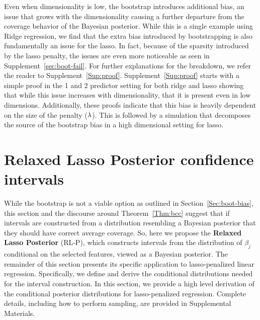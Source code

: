 Even when dimensionality is low, the bootstrap introduces additional bias, an issue that grows with the dimensionality causing a further departure from the coverage behavior of the Bayesian posterior. While this is a single example using Ridge regression, we find that the extra bias introduced by bootstrapping is also fundamentally an issue for the lasso. In fact, because of the sparsity introduced by the lasso penalty, the issues are even more noticeable as seen in Supplement~\ref{sec:boot-fail}. For further explanations for the breakdown, we refer the reader to Supplement~\ref{Sup:proof}. Supplement~\ref{Sup:proof} starts with a simple proof in the 1 and 2 predictor setting for both ridge and lasso showing that while this issue increases with dimensionality, that it is present even in low dimensions. Additionally, these proofs indicate that this bias is heavily dependent on the size of the penalty ($\lambda$). This is followed by a simulation that decomposes the source of the bootstrap bias in a high dimensional setting for lasso. 

\section{Relaxed Lasso Posterior confidence intervals}\label{Sec:methods}


While the bootstrap is not a viable option as outlined in Section~\ref{Sec:boot-bias}, this section and the discourse around Theorem~\ref{Thm:bcc} suggest that if intervals are constructed from a distribution resembling a Bayesian posterior that they should have correct average coverage. So, here we propose the \textbf{Relaxed Lasso Posterior} (RL-P), which constructs intervals from the distribution of $\beta_j$ conditional on the selected features, viewed as a Bayesian posterior. The remainder of this section presents its specific application to lasso-penalized linear regression. Specifically, we define and derive the conditional distributions needed for the interval construction. In this section, we provide a high level derivation of the conditional posterior distributions for lasso-penalized regression. Complete details, including how to perform sampling, are provided in Supplemental Materials.

